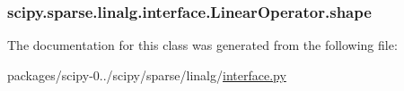 \subsubsection[{shape}]{\setlength{\rightskip}{0pt plus 5cm}scipy.\+sparse.\+linalg.\+interface.\+Linear\+Operator.\+shape}\label{classscipy_1_1sparse_1_1linalg_1_1interface_1_1LinearOperator_a9a14fb365cf7b10d25aa5f234f4671fc}


The documentation for this class was generated from the following file\+:\begin{DoxyCompactItemize}
\item 
packages/scipy-\/0../scipy/sparse/linalg/\hyperlink{interface_8py}{interface.\+py}\end{DoxyCompactItemize}
